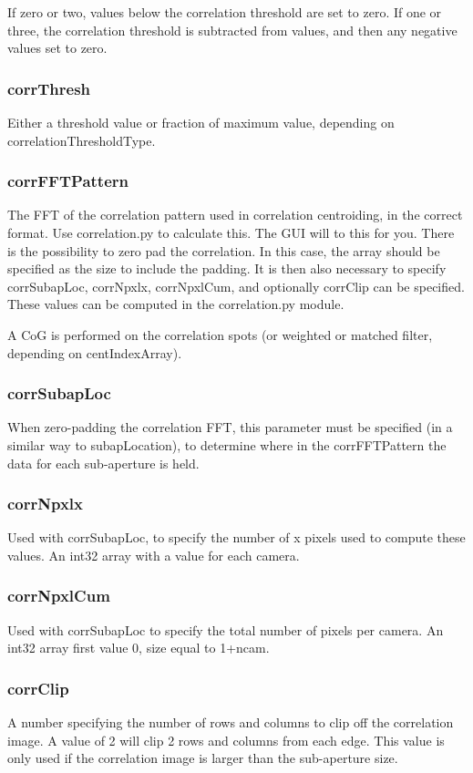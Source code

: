 \documentclass[a4,10pt]{article}
\begin{document}
If zero or two, values below the correlation threshold are set to
zero.  If one or three, the correlation threshold is subtracted from
values, and then any negative values set to zero.

\subsubsection{corrThresh}
Either a threshold value or fraction of maximum value, depending on
correlationThresholdType.

\subsubsection{corrFFTPattern}
The FFT of the correlation pattern used in correlation centroiding, in
the correct format.  Use correlation.py to calculate this.  The GUI
will to this for you.  There is the possibility to zero pad the correlation.
In this case, the array should be specified as the size to include the
padding.  It is then also necessary to specify corrSubapLoc,
corrNpxlx, corrNpxlCum, and optionally corrClip can be specified.
These values can be computed in the correlation.py module.

A CoG is performed on the correlation spots (or weighted or matched
filter, depending on centIndexArray).

\subsubsection{corrSubapLoc}
When zero-padding the correlation FFT, this parameter must be
specified (in a similar way to subapLocation), to determine where in
the corrFFTPattern the data for each sub-aperture is held.  

\subsubsection{corrNpxlx}
Used with corrSubapLoc, to specify the number of x pixels used to
compute these values.  An int32 array with a value for each camera.

\subsubsection{corrNpxlCum}
Used with corrSubapLoc to specify the total number of pixels per
camera.  An int32 array first value 0, size equal to 1+ncam.

\subsubsection{corrClip}
A number specifying the number of rows and columns to clip off the
correlation image.  A value of 2 will clip 2 rows and columns from
each edge.  This value is only used if the correlation image is larger
than the sub-aperture size.
\end{document}
